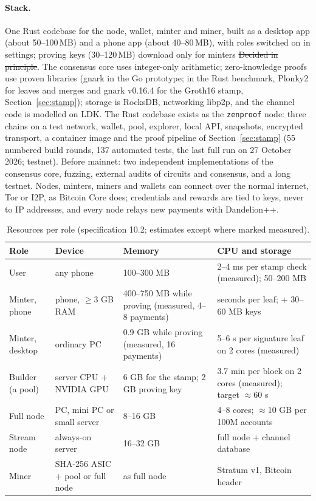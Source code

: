 \paragraph{Stack.} One Rust codebase for the node, wallet, minter and miner, built as a desktop app (about 50--100\,MB) and a phone app (about 40--80\,MB), with roles switched on in settings; proving keys (30--120\,MB) download only for minters \st{Decided in principle}. The consensus core uses integer-only arithmetic; zero-knowledge proofs use proven libraries (gnark in the Go prototype; in the Rust benchmark, Plonky2 for leaves and merges and gnark v0.16.4 for the Groth16 stamp, Section~\ref{sec:stamp}); storage is RocksDB, networking libp2p, and the channel code is modelled on LDK. The Rust codebase exists as the \texttt{zenproof} node: three chains on a test network, wallet, pool, explorer, local API, snapshots, encrypted transport, a container image and the proof pipeline of Section~\ref{sec:stamp} (55 numbered build rounds, 137 automated tests, the last full run on 27 October 2026; testnet). Before mainnet: two independent implementations of the consensus core, fuzzing, external audits of circuits and consensus, and a long testnet. Nodes, minters, miners and wallets can connect over the normal internet, Tor or I2P, as Bitcoin Core does; credentials and rewards are tied to keys, never to IP addresses, and every node relays new payments with Dandelion++.

\begin{table}[htbp]
\centering\small
\begin{tabularx}{\textwidth}{l l Y Y}
\toprule
\textbf{Role} & \textbf{Device} & \textbf{Memory} & \textbf{CPU and storage}\\
\midrule
User & any phone & 100--300 MB & 2--4 ms per stamp check (measured); 50--200 MB\\
Minter, phone & phone, $\ge$3 GB RAM & 400--750 MB while proving (measured, 4--8 payments) & seconds per leaf; + 30--60 MB keys\\
Minter, desktop & ordinary PC & 0.9 GB while proving (measured, 16 payments) & 5--6 s per signature leaf on 2 cores (measured)\\
Builder (a pool) & server CPU + NVIDIA GPU & 6 GB for the stamp; 2 GB proving key & 3.7 min per block on 2 cores (measured); target $\approx$60 s\\
Full node & PC, mini PC or small server & 8--16 GB & 4--8 cores; $\approx$10 GB per 100M accounts\\
Stream node & always-on server & 16--32 GB & full node + channel database\\
Miner & SHA-256 ASIC + pool or full node & as full node & Stratum v1, Bitcoin header\\
\bottomrule
\end{tabularx}
\caption{Resources per role (specification 10.2; estimates except where marked measured).}
\end{table}

